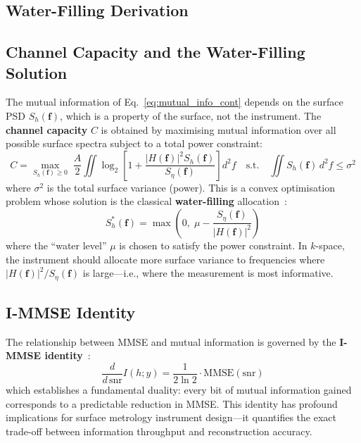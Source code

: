 


\subsection{Water-Filling Derivation}
\label{S4.1}
\subsection{Channel Capacity and the Water-Filling Solution}

The mutual information of Eq.~\ref{eq:mutual_info_cont} depends on the surface PSD $S_h(\mathbf{f})$, which is a property of the surface, not the instrument. The \textbf{channel capacity} $C$ is obtained by maximising mutual information over all possible surface spectra subject to a total power constraint:
\begin{equation}
    C = \max_{S_h(\mathbf{f}) \geq 0} \; \frac{A}{2} \iint \log_2\!\left[1 + \frac{|H(\mathbf{f})|^2 S_h(\mathbf{f})}{S_\eta(\mathbf{f})}\right] d^2\!f \quad \text{s.t.} \quad \iint S_h(\mathbf{f}) \, d^2\!f \leq \sigma^2
    \label{eq:capacity_max}
\end{equation}
where $\sigma^2$ is the total surface variance (power). This is a convex optimisation problem whose solution is the classical \textbf{water-filling} allocation~\cite{cover2006elements}:
\begin{equation}
    S_h^*(\mathbf{f}) = \max\!\left(0, \; \mu - \frac{S_\eta(\mathbf{f})}{|H(\mathbf{f})|^2}\right)
    \label{eq:waterfilling}
\end{equation}
where the ``water level'' $\mu$ is chosen to satisfy the power constraint. In $k$-space, the instrument should allocate more surface variance to frequencies where $|H(\mathbf{f})|^2 / S_\eta(\mathbf{f})$ is large---i.e., where the measurement is most informative.



\subsection{I-MMSE Identity}
\label{S4.2}
The relationship between MMSE and mutual information is governed by the \textbf{I-MMSE identity}~\cite{guo2005mutual}:
\begin{equation}
    \frac{d}{d\,\mathrm{snr}} I(h; y) = \frac{1}{2\ln 2} \cdot \mathrm{MMSE}(\mathrm{snr})
    \label{eq:immse}
\end{equation}
which establishes a fundamental duality: every bit of mutual information gained corresponds to a predictable reduction in MMSE. This identity has profound implications for surface metrology instrument design---it quantifies the exact trade-off between information throughput and reconstruction accuracy.

